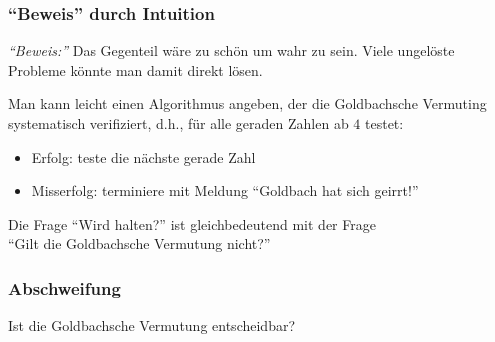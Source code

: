 \documentclass[onlymath]{beamer}
\begin{document}
\begin{frame}[t]\frametitle{"`Beweis"' durch Intuition}

\pause

\emph{"`Beweis:"'} Das Gegenteil wäre zu schön um wahr zu sein. Viele ungelöste Probleme
könnte man damit direkt lösen.\bigskip\pause

\pause

Man kann leicht einen Algorithmus  angeben, der die Goldbachsche Vermuting systematisch verifiziert, d.h., für alle geraden Zahlen ab $4$ testet:
\begin{itemize}
\item Erfolg: teste die nächste gerade Zahl
\item Misserfolg: terminiere mit Meldung "`Goldbach hat sich geirrt!"'
\end{itemize}

Die Frage "`Wird  halten?"' ist gleichbedeutend mit der Frage\\"`Gilt die Goldbachsche Vermutung nicht?"'

\end{frame}

\begin{frame}\frametitle{Abschweifung}

\begin{center}
\large Ist die Goldbachsche Vermutung entscheidbar?
\end{center}

\end{frame}
\end{document}
